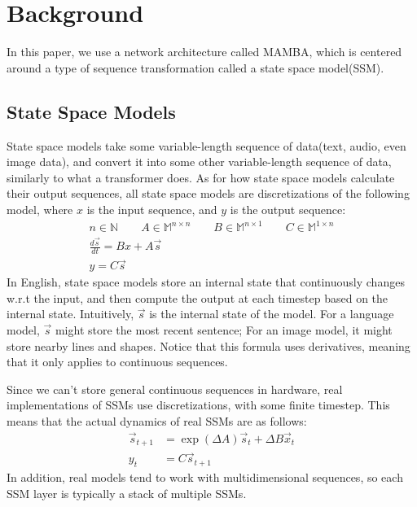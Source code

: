 \providecommand\NN{{\mathbb N}}
\providecommand\MM{{\mathbb M}}

\section{Background}
In this paper, we use a network architecture called MAMBA, which is centered
around a type of sequence transformation called a state space model(SSM).
\subsection{State Space Models}
State space models take some variable-length sequence of data(text, audio, even
image data), and convert it into some other variable-length sequence of data,
similarly to what a transformer does.
As for how state space models calculate their output sequences, all state space
models are discretizations of the following model, where $x$ is the input
sequence, and $y$ is the output sequence:
$$\begin{aligned}
    n \in \NN \qquad
    A \in \MM^{n \times n} \qquad
    B \in \MM^{n \times 1} \qquad
    C \in \MM^{1 \times n} \\
    \frac{d\vec{s}}{dt} = Bx + A\vec{s}\\
    y = C\vec{s}
\end{aligned}$$
In English, state space models store an internal state that continuously changes
w.r.t the input, and then compute the output at each timestep based on the
internal state.
Intuitively, $\vec{s}$ is the internal state of the model.
For a language model, $\vec{s}$ might store the most recent sentence; For an
image model, it might store nearby lines and shapes.
Notice that this formula uses derivatives, meaning that it only applies to
continuous sequences.

Since we can't store general continuous sequences in hardware, real
implementations of SSMs use discretizations, with some finite timestep.
This means that the actual dynamics of real SSMs are as follows:
$$\begin{aligned}
    \vec{s}_{t+1} &= \exp(\Delta A)\vec{s}_{t} + \Delta B \vec x_{t} \\
    y_{t} &= C \vec{s}_{t+1}
\end{aligned}$$
In addition, real models tend to work with multidimensional sequences, so each
SSM layer is typically a stack of multiple SSMs.


